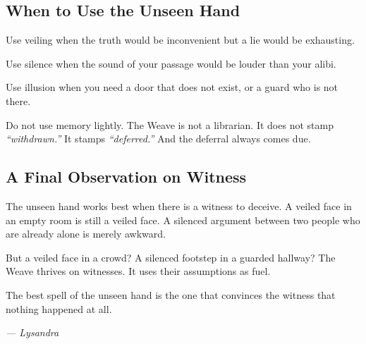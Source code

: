 \subsection{When to Use the Unseen Hand}

Use veiling when the truth would be inconvenient but a lie would be exhausting.

Use silence when the sound of your passage would be louder than your alibi.

Use illusion when you need a door that does not exist, or a guard who is not there.

Do not use memory lightly. The Weave is not a librarian. It does not stamp \emph{``withdrawn.''} It stamps \emph{``deferred.''} And the deferral always comes due.

\subsection{A Final Observation on Witness}

The unseen hand works best when there is a witness to deceive. A veiled face in an empty room is still a veiled face. A silenced argument between two people who are already alone is merely awkward.

But a veiled face in a crowd? A silenced footstep in a guarded hallway? The Weave thrives on witnesses. It uses their assumptions as fuel.

The best spell of the unseen hand is the one that convinces the witness that nothing happened at all.

\textit{--- Lysandra}
